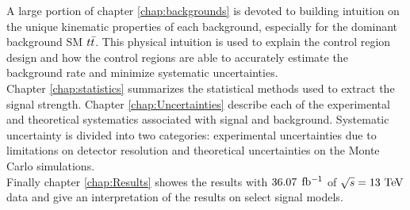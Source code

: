 \indent  A large portion of chapter \ref{chap:backgrounds} is devoted to building intuition on the unique kinematic properties of each background, especially for the dominant background SM $t\bar{t}$.  This physical intuition is used to explain the control region design and how the control regions are able to accurately estimate the background rate and minimize systematic uncertainties.  \\

\indent  Chapter \ref{chap:statistics} summarizes the statistical methods used to extract the signal strength. Chapter \ref{chap:Uncertainties} describe each of the experimental and theoretical systematics associated with signal and background.  Systematic uncertainty is divided into two categories: experimental uncertainties due to limitations on detector resolution and theoretical uncertainties on the Monte Carlo simulations. \\

\indent Finally chapter \ref{chap:Results} showes the results with $36.07$ $\mbox{fb$^{-1}$}$ of $\sqrt{s} = 13 \tev$ data and give an interpretation of the results on select signal models.  \\



